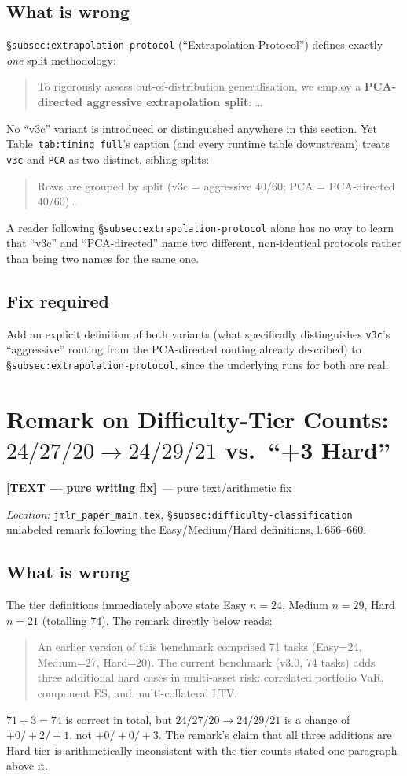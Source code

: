 \documentclass[11pt]{article}
\newcommand{\textfix}{\textcolor{green!40!black}{\textbf{[TEXT --- pure writing fix]}}}
\newcommand{\loc}[1]{\textit{Location:} #1\par}
\newenvironment{evidence}
  {\begin{quote}\small\ttfamily}
  {\end{quote}}
\begin{document}
\subsection*{What is wrong}
\S\texttt{subsec:extrapolation-protocol} (``Extrapolation Protocol'') defines
exactly \emph{one} split methodology:
\begin{evidence}
To rigorously assess out-of-distribution generalisation, we employ a
\textbf{PCA-directed aggressive extrapolation split}: \ldots
\end{evidence}
No ``v3c'' variant is introduced or distinguished anywhere in this section.
Yet Table~\texttt{tab:timing\_full}'s caption (and every runtime table
downstream) treats \texttt{v3c} and \texttt{PCA} as two distinct,
sibling splits:
\begin{evidence}
Rows are grouped by split (v3c = aggressive 40/60; PCA = PCA-directed 40/60)\ldots
\end{evidence}
A reader following \S\texttt{subsec:extrapolation-protocol} alone has no way to
learn that ``v3c'' and ``PCA-directed'' name two different, non-identical
protocols rather than being two names for the same one.

\subsection*{Fix required}
Add an explicit definition of both variants (what specifically distinguishes
\texttt{v3c}'s ``aggressive'' routing from the PCA-directed routing already
described) to \S\texttt{subsec:extrapolation-protocol}, since the underlying
runs for both are real.

\section{Remark on Difficulty-Tier Counts: $24/27/20 \to 24/29/21$ vs.\ ``+3 Hard''}
\label{issue:7}
\textfix\ --- pure text/arithmetic fix

\loc{\texttt{jmlr\_paper\_main.tex}, \S\texttt{subsec:difficulty-classification}
unlabeled remark following the Easy/Medium/Hard definitions, l.\,656--660.}

\subsection*{What is wrong}
The tier definitions immediately above state Easy $n=24$, Medium $n=29$,
Hard $n=21$ (totalling 74). The remark directly below reads:
\begin{evidence}
An earlier version of this benchmark comprised 71 tasks (Easy=24, Medium=27,
Hard=20). The current benchmark (v3.0, 74 tasks) adds three additional hard
cases in multi-asset risk: correlated portfolio VaR, component ES, and
multi-collateral LTV.
\end{evidence}
$71 + 3 = 74$ is correct in total, but $24/27/20 \to 24/29/21$ is a change
of $+0/+2/+1$, not $+0/+0/+3$. The remark's claim that all three additions
are Hard-tier is arithmetically inconsistent with the tier counts stated one
paragraph above it.
\end{document}
